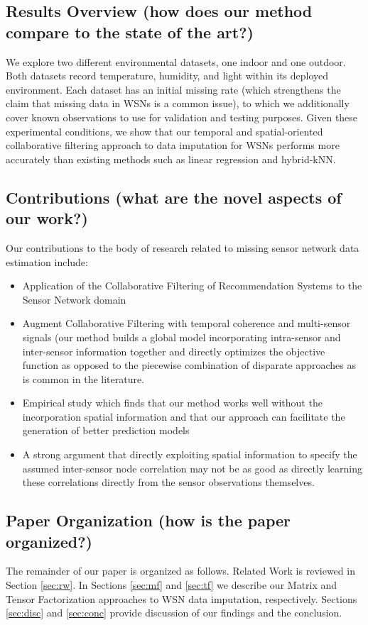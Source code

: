 \subsection{Results Overview (how does our method compare to the state of the art?)}
We explore two different environmental datasets, one indoor and one outdoor.
Both datasets record temperature, humidity, and light within its deployed environment.
Each dataset has an initial missing rate (which strengthens the claim that missing data in WSNs is a common issue), to which we additionally cover known observations to use for validation and testing purposes.
Given these experimental conditions, we show that our temporal and spatial-oriented collaborative filtering approach to data imputation for WSNs performs more accurately than existing methods such as linear regression and hybrid-kNN.

\subsection{Contributions (what are the novel aspects of our work?)}
Our contributions to the body of research related to missing sensor network data estimation include:
\begin{itemize}
\item Application of the Collaborative Filtering of Recommendation Systems to the Sensor Network domain
\item Augment Collaborative Filtering with temporal coherence and multi-sensor signals (our method builds a global model incorporating intra-sensor and inter-sensor information together and directly optimizes the objective function as opposed to the piecewise combination of disparate approaches as is common in the literature.
\item Empirical study which finds that our method works well without the incorporation spatial information and that our approach can facilitate the generation of better prediction models
\item A strong argument that directly exploiting spatial information to specify the assumed inter-sensor node correlation may not be as good as directly learning these correlations directly from the sensor observations themselves.
\end{itemize}

\subsection{Paper Organization (how is the paper organized?)}
The remainder of our paper is organized as follows.
Related Work is reviewed in Section \ref{sec:rw}.
In Sections \ref{sec:mf} and \ref{sec:tf} we describe our Matrix and Tensor Factorization approaches to WSN data imputation, respectively.
Sections \ref{sec:disc} and \ref{sec:conc} provide discussion of our findings and the conclusion.
